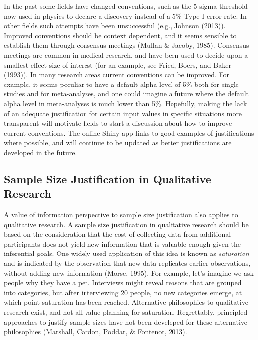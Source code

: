 \documentclass[
  english,
  ,jou,floatsintext]{apa6}
\begin{document}
In the past some fields have changed conventions, such as the 5 sigma threshold now used in physics to declare a discovery instead of a 5\% Type I error rate. In other fields such attempts have been unsuccessful (e.g., Johnson (2013)). Improved conventions should be context dependent, and it seems sensible to establish them through consensus meetings (Mullan \& Jacoby, 1985). Consensus meetings are common in medical research, and have been used to decide upon a smallest effect size of interest (for an example, see Fried, Boers, and Baker (1993)). In many research areas current conventions can be improved. For example, it seems peculiar to have a default alpha level of 5\% both for single studies and for meta-analyses, and one could imagine a future where the default alpha level in meta-analyses is much lower than 5\%. Hopefully, making the lack of an adequate justification for certain input values in specific situations more transparent will motivate fields to start a discussion about how to improve current conventions. The online Shiny app links to good examples of justifications where possible, and will continue to be updated as better justifications are developed in the future.

\hypertarget{sample-size-justification-in-qualitative-research}{%
\subsection{Sample Size Justification in Qualitative Research}\label{sample-size-justification-in-qualitative-research}}

A value of information perspective to sample size justification also applies to qualitative research. A sample size justification in qualitative research should be based on the consideration that the cost of collecting data from additional participants does not yield new information that is valuable enough given the inferential goals. One widely used application of this idea is known as \emph{saturation} and is indicated by the observation that new data replicates earlier observations, without adding new information (Morse, 1995). For example, let's imagine we ask people why they have a pet. Interviews might reveal reasons that are grouped into categories, but after interviewing 20 people, no new categories emerge, at which point saturation has been reached. Alternative philosophies to qualitative research exist, and not all value planning for saturation. Regrettably, principled approaches to justify sample sizes have not been developed for these alternative philosophies (Marshall, Cardon, Poddar, \& Fontenot, 2013).
\end{document}
